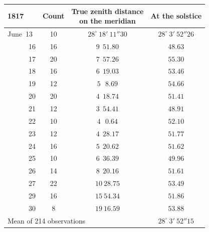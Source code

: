 \begin{center}\fontsize{10}{12}\selectfont\setlength{\tabcolsep}{3pt}
\begin{tabular}{l|c|c|c}
1817 & Count & \shortstack{True zenith distance\\on the meridian} & At the solstice \\
\hline
June\ 13 & 10 & $28^\circ\ 18'\ 11''30$ & $28^\circ\ 3'\ 52''26$ \\
\ \ \ \ \ \ 16 & 16 & $9\ \ 51.80$ & $48.63$ \\
\ \ \ \ \ \ 17 & 20 & $7\ \ 57.26$ & $55.30$ \\
\ \ \ \ \ \ 18 & 16 & $6\ \ 19.03$ & $53.46$ \\
\ \ \ \ \ \ 19 & 12 & $5\ \ \ 8.69$ & $54.66$ \\
\ \ \ \ \ \ 20 & 20 & $4\ \ 18.74$ & $51.41$ \\
\ \ \ \ \ \ 21 & 12 & $3\ \ 54.41$ & $48.91$ \\
\ \ \ \ \ \ 22 & 10 & $4\ \ \ 0.64$ & $52.10$ \\
\ \ \ \ \ \ 23 & 12 & $4\ \ 28.17$ & $51.77$ \\
\ \ \ \ \ \ 24 & 16 & $5\ \ 20.62$ & $51.62$ \\
\ \ \ \ \ \ 25 & 10 & $6\ \ 36.39$ & $49.96$ \\
\ \ \ \ \ \ 26 & 14 & $8\ \ 20.16$ & $51.61$ \\
\ \ \ \ \ \ 27 & 22 & $10\ 28.75$ & $53.49$ \\
\ \ \ \ \ \ 29 & 16 & $15\ 54.34$ & $51.86$ \\
\ \ \ \ \ \ 30 & 8 & $19\ 16.59$ & $53.88$ \\
\multicolumn{3}{l}{Mean of 214 observations} & $28^\circ\ 3'\ 52''15$ \\
\end{tabular}
\end{center}

